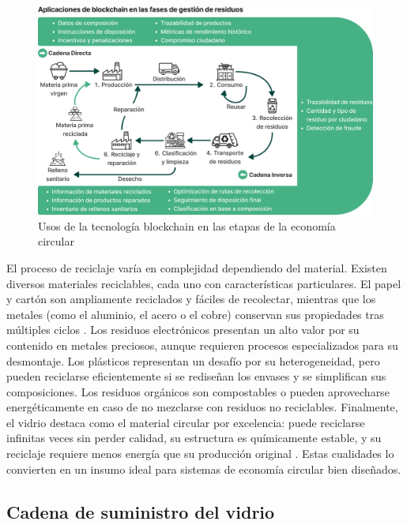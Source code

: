 \begin{figure}[!tb]
    \centering
    \includegraphics[width=\textwidth]{Figures/baralla-model-1.png}
    \caption[Usos de la tecnología blockchain en la economía circular]{Usos de la tecnología blockchain en las etapas de la economía circular \cite{baralla2023waste}}
    \label{fig:baralla-model-1}
\end{figure}

El proceso de reciclaje varía en complejidad dependiendo del material. Existen diversos materiales reciclables, cada uno con características particulares. El papel y cartón son ampliamente reciclados y fáciles de recolectar, mientras que los metales (como el aluminio, el acero o el cobre) conservan sus propiedades tras múltiples ciclos \cite{cepal2021economia}. Los residuos electrónicos presentan un alto valor por su contenido en metales preciosos, aunque requieren procesos especializados para su desmontaje. Los plásticos representan un desafío por su heterogeneidad, pero pueden reciclarse eficientemente si se rediseñan los envases y se simplifican sus composiciones. Los residuos orgánicos son compostables o pueden aprovecharse energéticamente en caso de no mezclarse con residuos no reciclables. Finalmente, el vidrio destaca como el material circular por excelencia: puede reciclarse infinitas veces sin perder calidad, su estructura es químicamente estable, y su reciclaje requiere menos energía que su producción original \cite{verallia2022whitebook}. Estas cualidades lo convierten en un insumo ideal para sistemas de economía circular bien diseñados.

\subsection{Cadena de suministro del vidrio}
\label{sec:glass-supply-chain}

